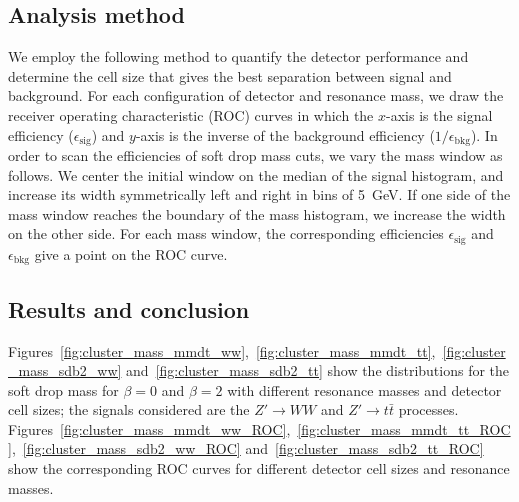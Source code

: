 \subsection{Analysis method \label{sec:massana}}
We employ the following method to quantify the detector performance and 
determine the cell size that gives the best separation between  
signal and background. For each configuration of detector and resonance mass, 
we draw the receiver operating characteristic (ROC) curves in which the $x$-axis
 is the signal efficiency ($\epsilon_\mathrm{sig}$) and $y$-axis is the inverse 
of the background efficiency ($1/\epsilon_\mathrm{bkg}$). 
In order to scan the efficiencies of soft drop mass cuts, we vary the mass 
window as follows. We center the initial window on the median of the signal histogram, and increase its width symmetrically left and right in bins of 5~GeV. 
If one side of the mass window reaches the boundary 
of the mass histogram, we increase the width on the other side. For each mass window, the corresponding efficiencies 
$\epsilon_\mathrm{sig}$ and $\epsilon_\mathrm{bkg}$ give a point on 
the ROC curve.

\subsection{Results and conclusion}

Figures~\ref{fig:cluster_mass_mmdt_ww},~\ref{fig:cluster_mass_mmdt_tt},~\ref{fig:cluster_mass_sdb2_ww} and~\ref{fig:cluster_mass_sdb2_tt} 
show the distributions for the soft drop mass for $\beta=0$ and $\beta=2$ with  
different resonance masses and detector cell sizes; the signals considered are 
the $Z'\rightarrow WW$ and $Z'\rightarrow t\bar{t}$ processes. 
Figures~\ref{fig:cluster_mass_mmdt_ww_ROC},~\ref{fig:cluster_mass_mmdt_tt_ROC},~\ref{fig:cluster_mass_sdb2_ww_ROC} and~\ref{fig:cluster_mass_sdb2_tt_ROC} 
show the corresponding ROC curves for different detector cell sizes and  resonance masses.


